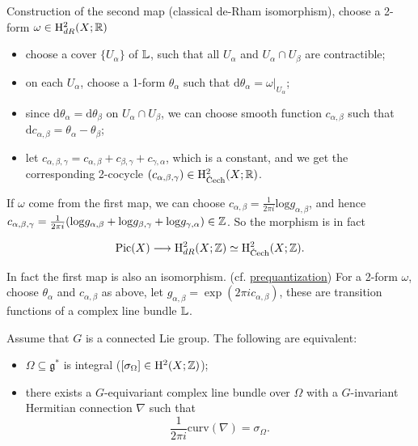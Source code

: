 \documentclass[12pt]{amsart}
\numberwithin{equation}{section}
\newcommand{\fg}{\mathfrak{g}} \newcommand{\fh}{\mathfrak{h}} \newcommand{\fk}{\mathfrak{k}}
\newcommand{\bra}[1]{\left(#1\right)}
\begin{document}
Construction of the second map (classical de-Rham isomorphism), choose a 2-form $\omega \in \mathrm{H}^{2}_{dR}(X;{\mathbb {R}})$
\begin{itemize}
  \item choose a cover $\{U_{\alpha}\}$ of ${\mathbb {L}}$, such that all $U_{\alpha}$ and $U_{\alpha} \cap U_{\beta}$ are contractible;
  \item on each $U_\alpha$, choose a 1-form $\theta_\alpha$ such that $\mathrm{d}\theta_\alpha = \omega|_{U_\alpha}$;
  \item since $\mathrm{d}\theta_\alpha = \mathrm{d}\theta_\beta$ on $U_\alpha \cap U_\beta$, we can choose smooth function $c_{\alpha,\beta}$ such that $\mathrm{d}c_{\alpha,\beta} = \theta_\alpha - \theta_\beta$;
  \item let $c_{\alpha,\beta,\gamma} = c_{\alpha,\beta} + c_{\beta,\gamma} + c_{\gamma,\alpha}$, which is a constant, and we get the corresponding 2-cocycle $(c_{\alpha,\beta,\gamma}) \in \mathrm{H}^{2}_{\text{\v{C}ech}}(X;\BR)$.
\end{itemize}

If $\omega$ come from the first map, we can choose $c_{\alpha,\beta} = \frac{1}{2\pi i}\mathrm{log}g_{\alpha,\beta}$, and hence $c_{\alpha,\beta,\gamma} = \frac{1}{2\pi i}(\mathrm{log}g_{\alpha,\beta} +\mathrm{log}g_{\beta,\gamma} +\mathrm{log}g_{\gamma,\alpha} ) \in {\mathbb {Z}}$. So the morphism is in fact

\[
    \mathrm{Pic}(X) \longrightarrow  \mathrm{H}^{2}_{dR}(X;\BZ) \simeq  \mathrm{H}^{2}_{\text{\v{C}ech}}(X;\BZ).
\]

In fact the first map is also an isomorphism. (cf. \href{http://staff.ustc.edu.cn/~wangzuoq/Courses/15S-Symp/SympGeom.html}{prequantization})
For a 2-form $\omega$, choose $\theta_\alpha$ and $c_{\alpha,\beta}$ as above, let $g_{\alpha,\beta} = \exp(2\pi i c_{\alpha,\beta})$, these are transition functions of a complex line bundle ${\mathbb {L}}$.

\begin{cor}
  Assume that $G$ is a connected Lie group. The following are equivalent:
  \begin{itemize}
    \item $\Omega \subseteq \fg^*$ is integral ($[\sigma_{\Omega}] \in \mathrm{H}^2(X;{\mathbb {Z}})$);
    \item there exists a $G$-equivariant complex line bundle over $\Omega$ with a $G$-invariant Hermitian connection $\nabla$ such that $$\frac{1}{2\pi i}\mathrm{curv}\bra{\nabla} = \sigma_{\Omega}.$$
  \end{itemize}
\end{cor}
\end{document}
